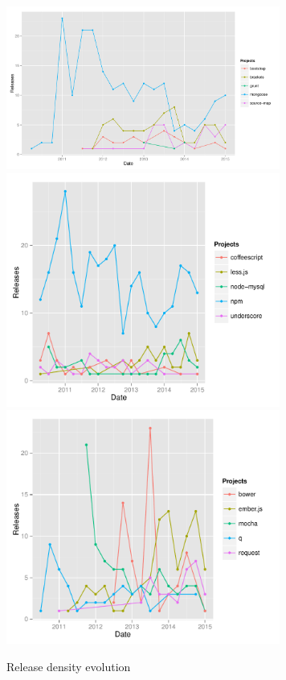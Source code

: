 \begin{figure}[thb!]
	\caption{Release density evolution}
	\label{fig:release_density}
	\includegraphics[width=90mm,scale=0.5]{figures/release_density}
	\includegraphics[width=90mm,scale=0.5]{figures/release_density_2}
	\includegraphics[width=90mm,scale=0.5]{figures/release_density_3}
\end{figure}

